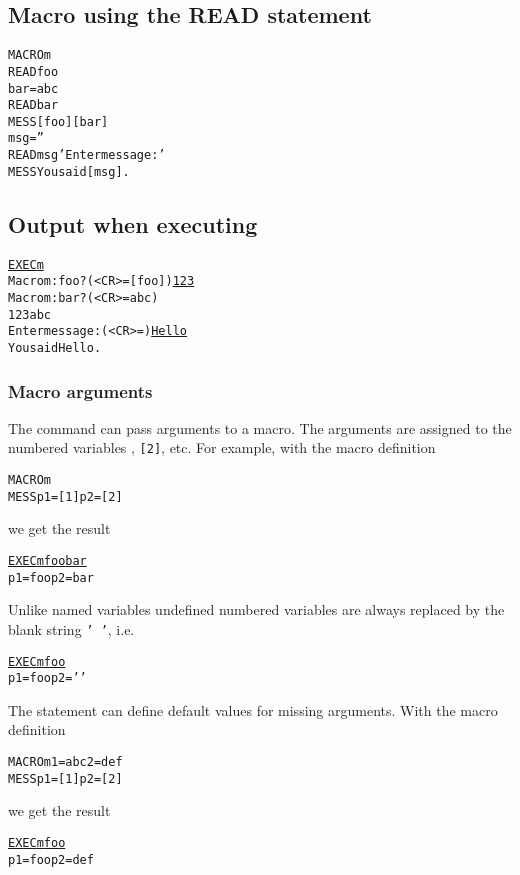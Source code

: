 \subsection*{Macro using the READ statement}
\begin{alltt}
MACRO m
READ foo
bar = abc
READ bar
MESS [foo] [bar]
msg = ''
READ msg 'Enter message:'
MESS You said [msg].
\end{alltt}
\subsection*{Output when executing}
\begin{alltt}
\PROMPT{} \underline{EXEC m}
 Macro m: foo ? (<CR>=[foo]) \underline{123}
 Macro m: bar ? (<CR>=abc)
 123 abc
 Enter message: (<CR>=) \underline{Hello}
 You said Hello.
\end{alltt}

\subsubsection{Macro arguments}

The  command can pass arguments to a macro.
The arguments are assigned to the numbered variables ,
\texttt{[2]}, etc.
For example, with the macro definition
\begin{alltt}
MACRO m
MESS p1=[1] p2=[2]
\end{alltt}
we get the result
\begin{alltt}
\PROMPT{} \underline{EXEC m foo bar}
 p1=foo p2=bar
\end{alltt}
Unlike named variables undefined numbered variables 
\MacVar[undefined]{}
are always replaced by the blank string \texttt{' '}, i.e.\
\begin{alltt}
\PROMPT{} \underline{EXEC m foo}
 p1=foo p2=' '
\end{alltt}

The  statement can define default values for missing
arguments.
With the macro definition
\begin{alltt}
MACRO m 1=abc 2=def
MESS p1=[1] p2=[2]
\end{alltt}
we get the result
\begin{alltt}
\PROMPT{} \underline{EXEC m foo}
 p1=foo p2=def
\end{alltt}

